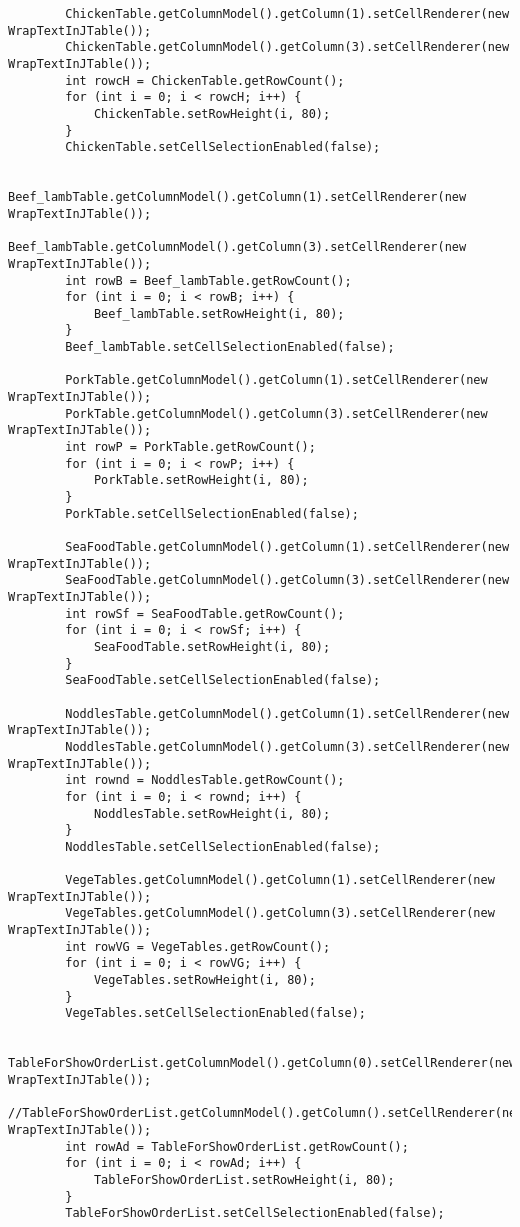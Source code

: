 \documentclass[12pt,a4paper]{article}
\begin{document}
\begin{lstlisting}
        ChickenTable.getColumnModel().getColumn(1).setCellRenderer(new WrapTextInJTable());
        ChickenTable.getColumnModel().getColumn(3).setCellRenderer(new WrapTextInJTable());
        int rowcH = ChickenTable.getRowCount();
        for (int i = 0; i < rowcH; i++) {
            ChickenTable.setRowHeight(i, 80);
        }
        ChickenTable.setCellSelectionEnabled(false);

        Beef_lambTable.getColumnModel().getColumn(1).setCellRenderer(new WrapTextInJTable());
        Beef_lambTable.getColumnModel().getColumn(3).setCellRenderer(new WrapTextInJTable());
        int rowB = Beef_lambTable.getRowCount();
        for (int i = 0; i < rowB; i++) {
            Beef_lambTable.setRowHeight(i, 80);
        }
        Beef_lambTable.setCellSelectionEnabled(false);

        PorkTable.getColumnModel().getColumn(1).setCellRenderer(new WrapTextInJTable());
        PorkTable.getColumnModel().getColumn(3).setCellRenderer(new WrapTextInJTable());
        int rowP = PorkTable.getRowCount();
        for (int i = 0; i < rowP; i++) {
            PorkTable.setRowHeight(i, 80);
        }
        PorkTable.setCellSelectionEnabled(false);

        SeaFoodTable.getColumnModel().getColumn(1).setCellRenderer(new WrapTextInJTable());
        SeaFoodTable.getColumnModel().getColumn(3).setCellRenderer(new WrapTextInJTable());
        int rowSf = SeaFoodTable.getRowCount();
        for (int i = 0; i < rowSf; i++) {
            SeaFoodTable.setRowHeight(i, 80);
        }
        SeaFoodTable.setCellSelectionEnabled(false);

        NoddlesTable.getColumnModel().getColumn(1).setCellRenderer(new WrapTextInJTable());
        NoddlesTable.getColumnModel().getColumn(3).setCellRenderer(new WrapTextInJTable());
        int rownd = NoddlesTable.getRowCount();
        for (int i = 0; i < rownd; i++) {
            NoddlesTable.setRowHeight(i, 80);
        }
        NoddlesTable.setCellSelectionEnabled(false);

        VegeTables.getColumnModel().getColumn(1).setCellRenderer(new WrapTextInJTable());
        VegeTables.getColumnModel().getColumn(3).setCellRenderer(new WrapTextInJTable());
        int rowVG = VegeTables.getRowCount();
        for (int i = 0; i < rowVG; i++) {
            VegeTables.setRowHeight(i, 80);
        }
        VegeTables.setCellSelectionEnabled(false);

        TableForShowOrderList.getColumnModel().getColumn(0).setCellRenderer(new WrapTextInJTable());
        //TableForShowOrderList.getColumnModel().getColumn().setCellRenderer(new WrapTextInJTable());
        int rowAd = TableForShowOrderList.getRowCount();
        for (int i = 0; i < rowAd; i++) {
            TableForShowOrderList.setRowHeight(i, 80);
        }
        TableForShowOrderList.setCellSelectionEnabled(false);


\end{lstlisting}
\end{document}
